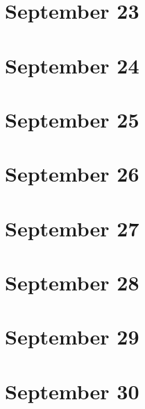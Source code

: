 \section{September 23}

\section{September 24}

\section{September 25}

\section{September 26}

\section{September 27}

\section{September 28}

\section{September 29}

\section{September 30}

